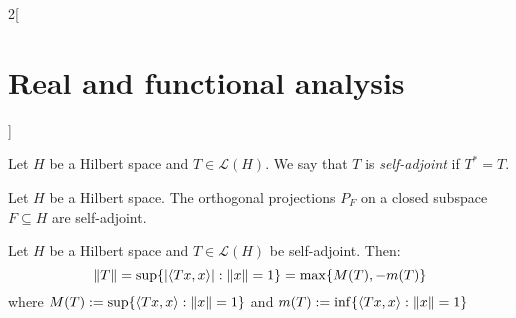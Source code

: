 \documentclass[../../../main_math.tex]{subfiles}
\begin{document}
\begin{multicols}{2}[\section{Real and functional analysis}]
\begin{proposition}
\begin{enumerate}
    \end{enumerate}
  \end{proposition}
  \begin{definition}
    Let $H$ be a Hilbert space and $T\in\mathcal{L}(H)$. We say that $T$ is \emph{self-adjoint} if $T^*=T$.
  \end{definition}
  \begin{lemma}
    Let $H$ be a Hilbert space. The orthogonal projections $P_F$ on a closed subspace $F\subseteq H$ are self-adjoint.
  \end{lemma}
  \begin{proposition}
    Let $H$ be a Hilbert space and $T\in\mathcal{L}(H)$ be self-adjoint. Then: $$\left\|T\right\|=\sup\{\abs{{\left\langle Tx,x\right\rangle}}:\left\|x\right\|=1\}=\max\{M(T),-m(T)\}$$
    where $M(T):=\sup\{{\left\langle Tx,x\right\rangle}:\left\|x\right\|=1\}$ and $m(T):=\inf\{{\left\langle Tx,x\right\rangle}:\left\|x\right\|=1\}$
  \end{proposition}

\end{multicols}
\end{document}
